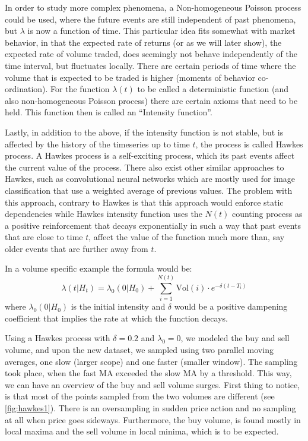In order to study more complex phenomena, a Non-homogeneous Poisson process could be used, where the future events are still independent of past phenomena, but \( \lambda \) is now a function of time. This particular idea fits somewhat with market behavior, in that the expected rate of returns (or as we will later show), the expected rate of volume traded, does seemingly not behave independently of the time interval, but fluctuates locally. There are certain periods of time where the volume that is expected to be traded is higher (moments of behavior co-ordination). For the function \( \lambda(t) \) to be called a deterministic function (and also non-homogeneous Poisson process) there are certain axioms that need to be held. This function then is called an “Intensity function”.

Lastly, in addition to the above, if the intensity function is not stable, but is affected by the history of the timeseries up to time \(t\), the process is called Hawkes process. A Hawkes process is a self-exciting process, which its past events affect the current value of the process. There also exist other similar approaches to Hawkes, such as convolutional neural networks which are mostly used for image classification that use a weighted average of previous values. The problem with this approach, contrary to Hawkes is that this approach would enforce static dependencies while Hawkes intensity function uses the \(N(t)\) counting process as a positive reinforcement that decays exponentially in such a way that past events that are close to time \(t\), affect the value of the function much more than, say older events that are further away from \(t\). 

In a volume specific example the formula would be:
\[ \lambda(t|H_t) = \lambda_0(0|H_0) + \sum_{i=1}^{N(t)}\text{Vol}(i) \cdot e^{-\delta(t-T_i)} \]
where \(\lambda_0(0|H_0) \) is the initial intensity and \( \delta \) would be a positive dampening coefficient that implies the rate at which the function decays.

Using a Hawkes process with \( \delta = 0.2 \) and \( \lambda_0 = 0 \), we modeled the buy and sell volume, and upon the new dataset, we sampled using two parallel moving averages, one slow (larger scope) and one faster (smaller window). The sampling took place, when the fast MA exceeded the slow MA by a threshold. This way, we can have an overview of the buy and sell volume surges. First thing to notice, is that most of the points sampled from the two volumes are different (see \ref{fig:hawkes1}). There is an oversampling in sudden price action and no sampling at all when price goes sideways. Furthermore, the buy volume, is found mostly in local maxima and the sell volume in local minima, which is to be expected.

